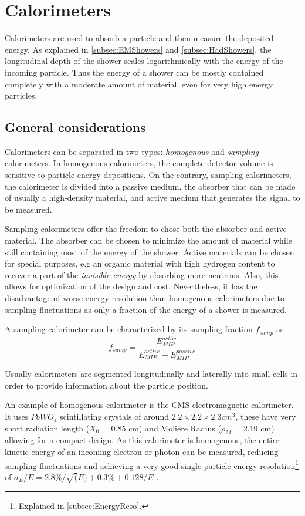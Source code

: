 \section{Calorimeters}

Calorimeters are used to absorb a particle and then measure the deposited energy. As explained in \ref{subsec:EMShowers} and \ref{subsec:HadShowers}, the longitudinal depth of the shower scales logarithmically with the energy of the incoming particle. Thus the energy of a shower can be mostly contained completely with a moderate amount of material, even for very high energy particles.

\subsection{General considerations}

Calorimeters can be separated in two types: \textit{homogenous} and \textit{sampling} calorimeters. In homogenous calorimeters, the complete detector volume is sensitive to particle energy depositions. On the contrary, sampling calorimeters, the calorimeter is divided into a passive medium, the absorber that can be made of usually a high-density material, and active medium that generates the signal to be measured.

Sampling calorimeters offer the freedom to chose both the absorber and active material. The absorber can be chosen to minimize the amount of material while still containing most of the energy of the shower. Active materials can be chosen for special purposes, e.g an organic material with high hydrogen content to recover a part of the \textit{invisible energy} by absorbing more neutrons. Also, this allows for optimization of the design and cost. Nevertheless, it has the disadvantage of worse energy resolution than homogenous calorimeters due to sampling fluctuations as only a fraction of the energy of a shower is measured.

A sampling calorimeter can be characterized by its sampling fraction $f_{samp}$ as
\begin{equation}
  f_{samp} = \frac{E_{MIP}^{active}}{E_{MIP}^{active} + E_{MIP}^{passive}}
\end{equation}

Usually calorimeters are segmented longitudinally and laterally into small cells in order to provide information about the particle position.

An example of homogenous calorimeter is the CMS electromagnetic calorimeter. It uses $PbWO_4$ scintillating crystals of around $2.2 \times 2.2 \times 2.3 cm^3$, these have very short radiation length ($X_0$ = 0.85 cm) and Moli\'ere Radius ($\rho_M$ = 2.19 cm) allowing for a compact design. As this calorimeter is homogenous, the entire kinetic energy of an incoming electron or photon can be measured, reducing sampling fluctuations and achieving a very good single particle energy resolution\footnote{Explained in \ref{subsec:EnergyReso}.} of $\sigma_E/E = 2.8\%/\sqrt(E) + 0.3\% + 0.128/E$ \cite{1742-6596-587-1-012001}.

